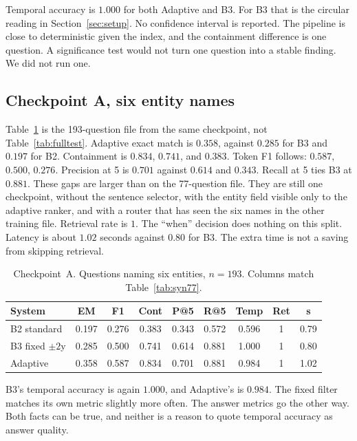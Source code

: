 \documentclass[11pt,letterpaper]{article}
\begin{document}
Temporal accuracy is $1.000$ for both Adaptive and B3.
For B3 that is the circular reading in Section~\ref{sec:setup}.
No confidence interval is reported.
The pipeline is close to deterministic given the index, and the containment difference is one question.
A significance test would not turn one question into a stable finding.
We did not run one.

\subsection{Checkpoint A, six entity names}

Table~\ref{tab:held193} is the 193-question file from the same checkpoint, not Table~\ref{tab:fulltest}.
Adaptive exact match is $0.358$, against $0.285$ for B3 and $0.197$ for B2.
Containment is $0.834$, $0.741$, and $0.383$.
Token F1 follows: $0.587$, $0.500$, $0.276$.
Precision at 5 is $0.701$ against $0.614$ and $0.343$.
Recall at 5 ties B3 at $0.881$.
These gaps are larger than on the 77-question file.
They are still one checkpoint, without the sentence selector, with the entity field visible only to the adaptive ranker, and with a router that has seen the six names in the other training file.
Retrieval rate is $1$.
The ``when'' decision does nothing on this split.
Latency is about $1.02$ seconds against $0.80$ for B3.
The extra time is not a saving from skipping retrieval.

\begin{table}[t]
\centering
\caption{Checkpoint~A. Questions naming six entities, $n{=}193$. Columns match Table~\ref{tab:syn77}.}
\label{tab:held193}
\small
\begin{tabular}{lcccccccc}
\toprule
System & EM & F1 & Cont & P@5 & R@5 & Temp & Ret & s \\
\midrule
B2 standard & 0.197 & 0.276 & 0.383 & 0.343 & 0.572 & 0.596 & 1 & 0.79 \\
B3 fixed $\pm 2$y & 0.285 & 0.500 & 0.741 & 0.614 & 0.881 & 1.000 & 1 & 0.80 \\
Adaptive & 0.358 & 0.587 & 0.834 & 0.701 & 0.881 & 0.984 & 1 & 1.02 \\
\bottomrule
\end{tabular}
\end{table}

B3's temporal accuracy is again $1.000$, and Adaptive's is $0.984$.
The fixed filter matches its own metric slightly more often.
The answer metrics go the other way.
Both facts can be true, and neither is a reason to quote temporal accuracy as answer quality.
\end{document}
